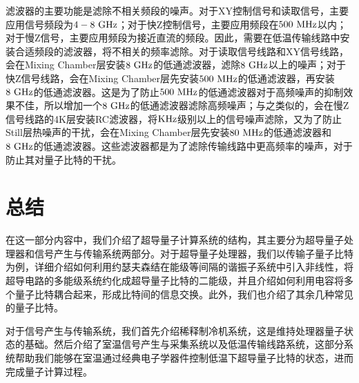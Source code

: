 滤波器的主要功能是滤除不相关频段的噪声。对于XY控制信号和读取信号，主要应用信号频段为$\rm 4-8 \ GHz$；对于快Z控制信号，主要应用频段在$\rm 500 \ MHz$以内；对于慢Z信号，主要应用频段为接近直流的频段。因此，需要在低温传输线路中安装合适频段的滤波器，将不相关的频率滤除。对于读取信号线路和XY信号线路，会在Mixing Chamber层安装$\rm 8\ GHz$的低通滤波器，滤除$\rm 8\ GHz$以上的噪声；对于快Z信号线路，会在Mixing Chamber层先安装$\rm 500 \ MHz$的低通滤波器，再安装$\rm 8\ GHz$的低通滤波器。这是为了防止$\rm 500 \ MHz$的低通滤波器对于高频噪声的抑制效果不佳，所以增加一个$\rm 8\ GHz$的低通滤波器滤除高频噪声；与之类似的，会在慢Z信号线路的4K层安装RC滤波器，将$\rm KHz$级别以上的信号噪声滤除，又为了防止Still层热噪声的干扰，会在Mixing Chamber层先安装$\rm 80 \ MHz$的低通滤波器和$\rm 8\ GHz$的低通滤波器。这些滤波器都是为了滤除传输线路中更高频率的噪声，对于防止其对量子比特的干扰\cite{martinis2014ucsb}。

\section{总结}
在这一部分内容中，我们介绍了超导量子计算系统的结构，其主要分为超导量子处理器和信号产生与传输系统两部分。对于超导量子处理器，我们以传输子量子比特为例，详细介绍如何利用约瑟夫森结在能级等间隔的谐振子系统中引入非线性，将超导电路的多能级系统约化成超导量子比特的二能级，并且介绍如何利用电容将多个量子比特耦合起来，形成比特间的信息交换。此外，我们也介绍了其余几种常见的量子比特。

对于信号产生与传输系统，我们首先介绍稀释制冷机系统，这是维持处理器量子状态的基础。然后介绍了室温信号产生与采集系统以及低温传输线路系统，这部分系统帮助我们能够在室温通过经典电子学器件控制低温下超导量子比特的状态，进而完成量子计算过程。


